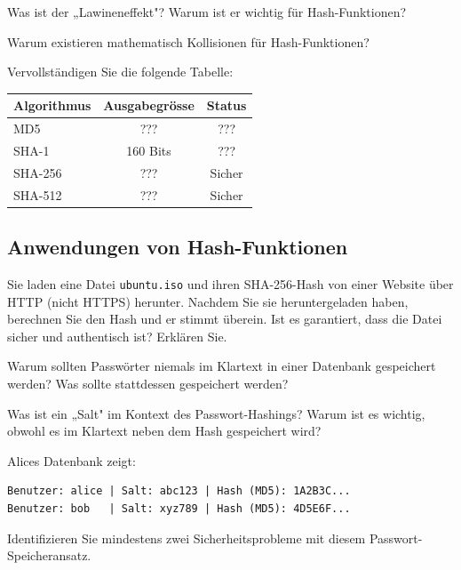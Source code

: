 \documentclass[11pt,a4paper]{report}
\begin{document}
\begin{ex}
Was ist der „Lawineneffekt"? Warum ist er wichtig für Hash-Funktionen?
\end{ex}

\begin{ex}
Warum existieren mathematisch Kollisionen für Hash-Funktionen?
\end{ex}

\begin{ex}
Vervollständigen Sie die folgende Tabelle:

\begin{center}
\begin{tabular}{|l|c|c|}
\hline
\textbf{Algorithmus} & \textbf{Ausgabegrösse} & \textbf{Status} \\
\hline
MD5 & ??? & ??? \\
SHA-1 & 160 Bits & ??? \\
SHA-256 & ??? & Sicher \\
SHA-512 & ??? & Sicher \\
\hline
\end{tabular}
\end{center}
\end{ex}

\subsection{Anwendungen von Hash-Funktionen}

\begin{ex}
Sie laden eine Datei \texttt{ubuntu.iso} und ihren SHA-256-Hash von einer Website über HTTP (nicht HTTPS) herunter. Nachdem Sie sie heruntergeladen haben, berechnen Sie den Hash und er stimmt überein. Ist es garantiert, dass die Datei sicher und authentisch ist? Erklären Sie.
\end{ex}

\begin{ex}
Warum sollten Passwörter niemals im Klartext in einer Datenbank gespeichert werden? Was sollte stattdessen gespeichert werden?
\end{ex}

\begin{ex}
Was ist ein „Salt" im Kontext des Passwort-Hashings? Warum ist es wichtig, obwohl es im Klartext neben dem Hash gespeichert wird?
\end{ex}

\begin{ex}
Alices Datenbank zeigt:
\begin{verbatim}
Benutzer: alice | Salt: abc123 | Hash (MD5): 1A2B3C...
Benutzer: bob   | Salt: xyz789 | Hash (MD5): 4D5E6F...
\end{verbatim}

Identifizieren Sie mindestens zwei Sicherheitsprobleme mit diesem Passwort-Speicheransatz.
\end{ex}
\end{document}
